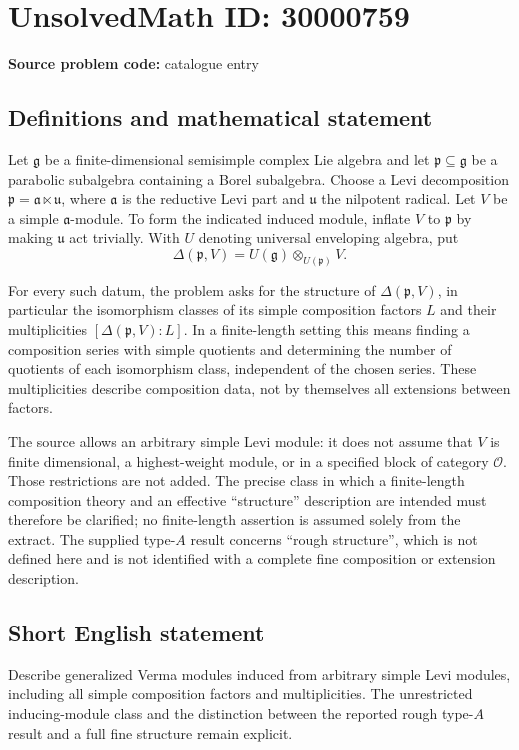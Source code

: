 \documentclass[11pt]{article}
\begin{document}
\section*{UnsolvedMath ID: 30000759}
\textbf{Source problem code:} catalogue entry
\subsection{Definitions and mathematical statement}
Let $\mathfrak g$ be a finite-dimensional semisimple complex Lie algebra and let $\mathfrak p\subseteq\mathfrak g$ be a parabolic subalgebra containing a Borel subalgebra. Choose a Levi decomposition $\mathfrak p=\mathfrak a\ltimes\mathfrak u$, where $\mathfrak a$ is the reductive Levi part and $\mathfrak u$ the nilpotent radical. Let $V$ be a simple $\mathfrak a$-module. To form the indicated induced module, inflate $V$ to $\mathfrak p$ by making $\mathfrak u$ act trivially. With $U$ denoting universal enveloping algebra, put
\[
\Delta(\mathfrak p,V)=U(\mathfrak g)\otimes_{U(\mathfrak p)}V.
\]

For every such datum, the problem asks for the structure of $\Delta(\mathfrak p,V)$, in particular the isomorphism classes of its simple composition factors $L$ and their multiplicities $[\Delta(\mathfrak p,V):L]$. In a finite-length setting this means finding a composition series with simple quotients and determining the number of quotients of each isomorphism class, independent of the chosen series. These multiplicities describe composition data, not by themselves all extensions between factors.

The source allows an arbitrary simple Levi module: it does not assume that $V$ is finite dimensional, a highest-weight module, or in a specified block of category $\mathcal O$. Those restrictions are not added. The precise class in which a finite-length composition theory and an effective ``structure'' description are intended must therefore be clarified; no finite-length assertion is assumed solely from the extract. The supplied type-$A$ result concerns ``rough structure'', which is not defined here and is not identified with a complete fine composition or extension description.
\subsection{Short English statement}
Describe generalized Verma modules induced from arbitrary simple Levi modules, including all simple composition factors and multiplicities. The unrestricted inducing-module class and the distinction between the reported rough type-$A$ result and a full fine structure remain explicit.
\end{document}

